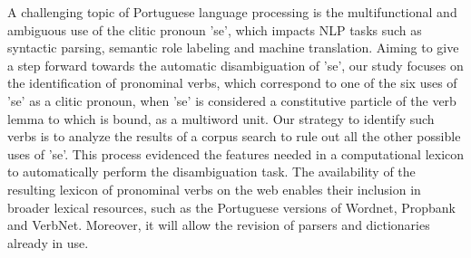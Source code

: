 A challenging topic of Portuguese language processing is the multifunctional and ambiguous use of the clitic pronoun 'se', which impacts NLP tasks such as
 syntactic parsing, semantic role labeling and machine translation. Aiming to
 give a step  forward towards the automatic disambiguation of 'se', our study
 focuses on the identification of pronominal verbs, which correspond to one of
 the six uses of 'se' as a clitic pronoun, when 'se' is considered a
 constitutive particle of the verb lemma to which is bound, as a multiword unit.
 Our strategy to  identify such verbs is to analyze the results of a corpus
 search to rule out all the other possible uses of 'se'. This process evidenced
 the features needed in a computational lexicon to automatically perform the
 disambiguation task. The availability of the resulting lexicon of pronominal
 verbs on the web enables their inclusion in broader lexical resources, such as
 the Portuguese versions of Wordnet, Propbank and VerbNet. Moreover, it will
 allow the revision of parsers and dictionaries already in use.

